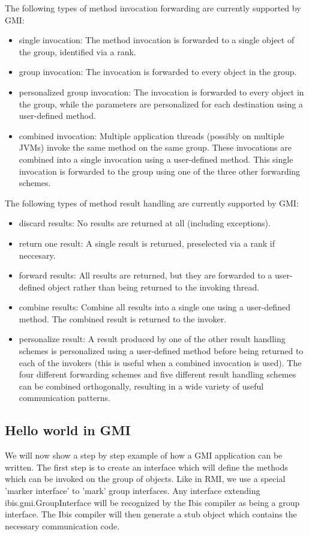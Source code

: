 \documentclass[10pt]{article}
\newcommand{\mysubsection}[1]{\subsection{#1}\label{#1}}
\begin{document}
The following types of method invocation forwarding are currently
supported by GMI:
\begin{itemize}
\item{single invocation:}
The method invocation is
forwarded to a single object of the group, identified via a rank.
\item{group invocation:}
The invocation is forwarded to every object in the
group.
\item{personalized group invocation:}
The invocation is forwarded to
every object in the group, while the parameters are personalized for
each destination using a user-defined method.
\item{combined invocation:}
Multiple application threads (possibly on multiple JVMs) invoke the
same method on the same group. These invocations are combined into a
single invocation using a user-defined method. This single invocation
is forwarded to the group using one of the three other forwarding
schemes.
\end{itemize}

The following types of method result handling are currently supported
by GMI:
\begin{itemize}
\item{discard results:}
No results are returned at all (including
exceptions).
\item{return one result:}
A single result is returned,
preselected via a rank if neccesary.
\item{forward results:}
All results are
returned, but they are forwarded to a user-defined object rather than
being returned to the invoking thread.
\item{combine results:}
Combine all
results into a single one using a user-defined method. The combined
result is returned to the invoker.
\item{personalize result:}
A result
produced by one of the other result handling schemes is personalized
using a user-defined method before being returned to each of the
invokers (this is useful when a combined invocation is used).  The
four different forwarding schemes and five different result handling
schemes can be combined orthogonally, resulting in a wide variety of
useful communication patterns.  
\end{itemize}

\mysubsection{Hello world in GMI}

We will now show a
step by step example of how a GMI application can be written. The
first step is to create an interface which will define the methods
which can be invoked on the group of objects. Like in RMI, we use a
special 'marker interface' to 'mark' group interfaces. Any interface
extending ibis.gmi.GroupInterface will be recognized by the Ibis
compiler as being a group interface. The Ibis compiler will then
generate a stub object which contains the necessary communication
code.
\end{document}
